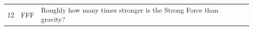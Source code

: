 \documentclass[10pt]{article}
\begin{document}
\begin{tiny}
\begin{longtable}{r p{0.3in} p{1.212in} p{3.8in}}
    12 &          FFF &                                                                                                                                                                                                                Roughly how many times stronger is the Strong Force than gravity? &                                                                                                                                                                                                                                                                                                                                                                                                                                                                                                                                                                                                                                                                                                                                                                                                                                                                                                                                                                                                                                                                                                                                                                                                                                                                                                                                                                                                                                                                                                                                                                                                                                                                                                                                                                                                                                                                                                                                                                                                                                                                                                                                                                                                                                                                                                                                                                                                                                                                                                                                                                                                                                                                                                                                                                                                                                                                                                                                                                                                                                                                                               
\end{longtable}
\end{tiny}
\end{document}
